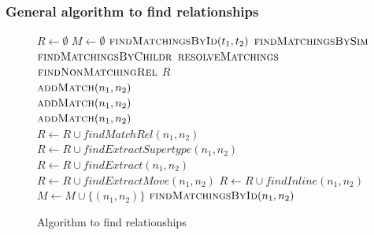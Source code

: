 \subsubsection{General algorithm to find relationships}

\begin{figure}[htbp]
\small
\begin{algorithmic}[1]
\State $R \gets \emptyset$
\State $M \gets \emptyset$
\State $\textsc{findMatchingsById}(t_1,t_2)$
\State $\textsc{findMatchingsBySim}$
\State $\textsc{findMatchingsByChildr}$
\State $\textsc{resolveMatchings}$
\State $\textsc{findNonMatchingRel}$
\State \Return $R$
\\
    \State $\textsc{addMatch}(n_1, n_2)$
  \EndIf
\EndFor
\EndProcedure
\\
    \State $\textsc{addMatch}(n_1, n_2)$
  \EndIf  
\EndFor
\EndProcedure
\\
    \State $\textsc{addMatch}(n_1, n_2)$
  \EndIf
\EndFor
\EndProcedure
\\
  \State $R \gets R \cup \mathit{findMatchRel}(n_1, n_2)$
\EndFor
\EndProcedure
\\
  \State $R \gets R \cup \mathit{findExtractSupertype}(n_1, n_2)$
  \State $R \gets R \cup \mathit{findExtract}(n_1, n_2)$
  \State $R \gets R \cup \mathit{findExtractMove}(n_1, n_2)$
\EndFor
{}
  \State $R \gets R \cup \mathit{findInline}(n_1, n_2)$
\EndFor
\EndProcedure
\\
  \State $M \gets M \cup \{(n_1, n_2)\}$
  \State $\textsc{findMatchingsById}(n_1,n_2)$
\EndIf
\EndProcedure
\\
\EndProcedure
\end{algorithmic}
\caption{Algorithm to find relationships}
\label{AlgoGeneral}
\end{figure}






